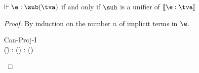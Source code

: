 \documentclass[acmsmall,screen,nonacm%
\Anonymous{,anonymous}{}%
\Final{}{,review}%
]{acmart}
\begin{document}
\begin{theorem}
  \label{thm:soundness-and-completeness}
  $\Th \e : \sub(\tv)$ if and only if $\sub$ is a unifier of $\csem {\e : \tv}$
  \begin{proof}
    By induction on the number $n$ of implicit terms in $\e$.
    \begin{proofcases}

	\begin{llproof}
\Hand	  {}
	\end{llproof}


	\begin{proofcases}
	  \proofcase{$\implies$}

	  \begin{proofcases}

	    \proofcasederivation
	      {Can-Proj-I}
	      {\eshape \E \e {\any \tvcs \Pi\iton \tvcs} \\ \sub(\G) \Th \E{} : \sub(\tv)}
	      {\Th \E{} : \sub(\tv)}


\end{proofcases}
\end{proofcases}
\end{proofcases}
\end{proof}
\end{theorem}
\end{document}
